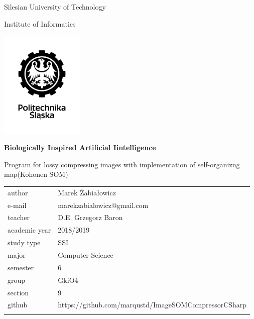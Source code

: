 \documentclass[12pt,a4paper]{article}
\begin{document}
\frenchspacing
\thispagestyle{empty}
\begin{center}
{\Large\sf Silesian University of Technology   %

Institute of Informatics

}

\vfill

\includegraphics[width=0.30\textwidth]{images/polsl}

\vfill\vfill

{\Huge\sffamily\bfseries Biologically Inspired Artificial Iintelligence} \\ %

\vfill\vfill

{\LARGE\sf Program for lossy compressing images with implementation of self-organizng map(Kohonen SOM)}  %


\vfill \vfill\vfill\vfill



\begin{tabular}{ll}
\toprule
	author                 						   & Marek Żabiałowicz\\
		e-mail                 						   & marekzabialowicz@gmail.com\\	
	teacher                                             & D.E. Grzegorz Baron			\\
	academic year                                         & 2018/2019					 \\
	study type                                         & SSI					 \\
	major                                               & Computer Science             \\
	semester                                                & 6                           \\
	group                                                  & GkiO4                        \\
	section                                                 & 9                           \\  
	github                                                 & https://github.com/marqustd/ImageSOMCompressorCSharp                           \\  
\bottomrule &  \\
\end{tabular}

\end{center}
\cleardoublepage
\end{document}
